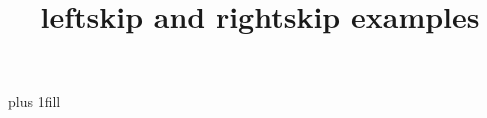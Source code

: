 \documentclass{article}
\title{leftskip and rightskip examples}
\begin{document}
	
	\mytextB
	
	\rightskip 10pt
	\leftskip 0pt plus 1fill
	\vspace{8pt}
	
	\mytextB
	
\end{document}
